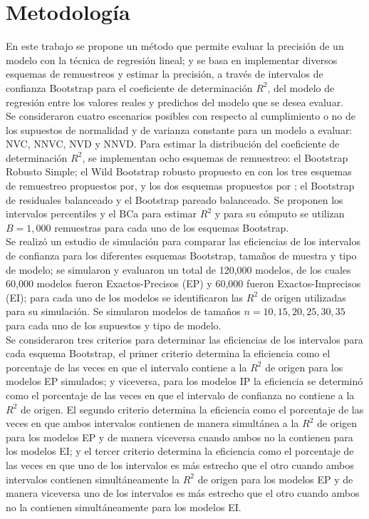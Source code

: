 \section{Metodología}
En este trabajo se propone un método que permite evaluar la precisión de un modelo con la técnica de regresión lineal; y se basa en implementar diversos esquemas de remuestreos y estimar la precisión, a través de intervalos de confianza Bootstrap para el coeficiente de determinación $R^2$, del modelo de regresión entre los valores reales y predichos del modelo que se desea evaluar.\\

Se consideraron cuatro escenarios posibles con respecto al cumplimiento o no de los supuestos de normalidad y de varianza constante para un modelo a evaluar: NVC, NNVC, NVD y NNVD. Para estimar la distribución del coeficiente de determinación $R^2$, se implementan ocho esquemas de remuestreo: el Bootstrap Robusto Simple; el Wild Bootstrap robusto propuesto en \textcite{rana-2012} con los tres esquemas de remuestreo propuestos por\textcite{wu-1986}, y los dos esquemas propuestos por \textcite{wu-1986}; el Bootstrap de residuales balanceado y el Bootstrap pareado balanceado. Se proponen los intervalos percentiles y el BCa para estimar $R^2$ y para su cómputo se utilizan $B=1,000$ remuestras para cada uno de los esquemas Bootstrap.\\ 

Se realizó un estudio de simulación para comparar las eficiencias de los intervalos de confianza para los diferentes esquemas Bootstrap, tamaños de muestra y tipo de modelo; se simularon y evaluaron un total de 120,000 modelos, de los cuales 60,000 modelos fueron Exactos-Precisos (EP) y 60,000 fueron Exactos-Imprecisos (EI); para cada uno de los modelos se identificaron las $R^2$ de origen utilizadas para su simulación. Se simularon modelos de tamaños $n=10, 15, 20, 25, 30, 35$ para cada uno de los supuestos y tipo de modelo.\\  

Se consideraron tres criterios para determinar las eficiencias de los intervalos para cada esquema Bootstrap, el primer criterio determina la eficiencia como el porcentaje de las veces en que el intervalo contiene a la $R^2$ de origen para los modelos EP simulados; y viceversa, para los modelos IP la eficiencia se determinó como el porcentaje de las veces en que el intervalo de confianza no contiene a la $R^2$ de origen. El segundo criterio determina la eficiencia como el porcentaje de las veces en que ambos intervalos contienen de manera simultánea a la $R^2$ de origen para los modelos EP y de manera viceversa cuando ambos no la contienen para los modelos EI; y el tercer criterio determina la eficiencia como el porcentaje de las veces en que uno de los intervalos es más estrecho que el otro cuando ambos intervalos contienen simultáneamente la $R^2$ de origen para los modelos EP y de manera viceversa uno de los intervalos es más estrecho que el otro cuando ambos no la contienen simultáneamente para los modelos EI.\\

